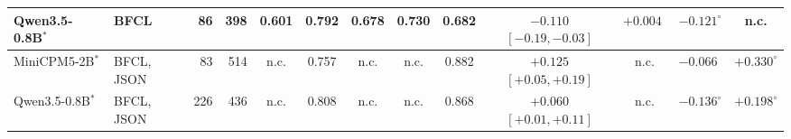 \begin{tabular}{@{}llrrccccccccc@{}}
Qwen3.5-0.8B$^{*}$ & BFCL & 86 & 398 & 0.601 & 0.792 & 0.678 & 0.730 & 0.682 & $-0.110$ {\scriptsize$[-0.19, -0.03]$} & $+0.004^{\phantom{\circ}}$ & $-0.121^{\circ}$ & n.c. \\
\midrule
MiniCPM5-2B$^{*}$ & BFCL, JSON & 83 & 514 & n.c. & 0.757 & n.c. & n.c. & 0.882 & $+0.125$ {\scriptsize$[+0.05, +0.19]$} & n.c. & $-0.066^{\phantom{\circ}}$ & $+0.330^{\circ}$ \\
Qwen3.5-0.8B$^{*}$ & BFCL, JSON & 226 & 436 & n.c. & 0.808 & n.c. & n.c. & 0.868 & $+0.060$ {\scriptsize$[+0.01, +0.11]$} & n.c. & $-0.136^{\circ}$ & $+0.198^{\circ}$ \\
\bottomrule
\end{tabular}
